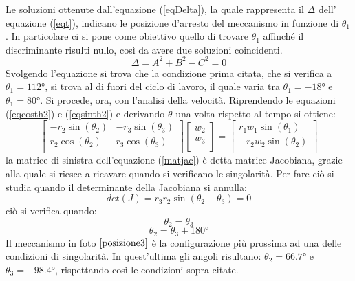 \documentclass{article}
\begin{document}
Le soluzioni ottenute dall'equazione (\ref{eqDelta}), la quale rappresenta il $\Delta$ dell' equazione (\ref{eqt}), indicano le posizione d'arresto del meccanismo in funzione di $\theta_1$.
In particolare ci si pone come obiettivo quello di trovare $\theta_1$ affinché il discriminante risulti nullo, così da avere due soluzioni coincidenti. 
\begin{equation}
    \Delta = A^2 + B^2 -C^2 = 0
    \label{eqDelta}
\end{equation}
Svolgendo l'equazione si trova che la condizione prima citata, che si verifica a $\theta_1 = 112\si{\degree}$, si trova al di fuori del ciclo di lavoro, il quale varia tra $\theta_1= -18\si{\degree}$ e $\theta_1 = 80\si{\degree}$.
Si procede, ora, con l'analisi della velocità.
Riprendendo le equazioni (\ref{eqcosth2}) e (\ref{eqsinth2}) e derivando $\theta$ una volta rispetto al tempo si ottiene:
\begin{equation}
    \begin{bmatrix}
       -r_2\sin(\theta_2) & -r_3\sin(\theta_3) \\
        r_2\cos(\theta_2) & r_3\cos(\theta_3) \\
    \end{bmatrix}
    \begin{bmatrix}
        w_2 \\
        w_3 \\
    \end{bmatrix}
    =
    \begin{bmatrix}
        r_1w_1\sin(\theta_1) \\
        -r_2w_2\sin(\theta_2)  \\
    \end{bmatrix}
    \label{matjac}
\end{equation}
la matrice di sinistra dell'equazione (\ref{matjac}) è detta matrice Jacobiana, grazie alla quale si riesce a ricavare quando si verificano le singolarità.
Per fare ciò si studia quando il determinante della Jacobiana si annulla:
\begin{equation}
    det(J) = r_3r_2\sin(\theta_2 - \theta_3) = 0
    \label{detJ}
\end{equation}
ciò si verifica quando:
\begin{equation*}
    \theta_2 = \theta_3
\end{equation*}
\begin{equation*}
    \theta_2 = \theta_3 + 180\si{\degree}
\end{equation*}
Il meccanismo in foto $\ref{posizione3}$ è la configurazione più prossima ad una delle condizioni di singolarità. In quest'ultima gli angoli risultano: $\theta_2 = 66.7\si{\degree}$ e $\theta_3 = -98.4\si{\degree}$, rispettando così le condizioni sopra citate.
\end{document}
